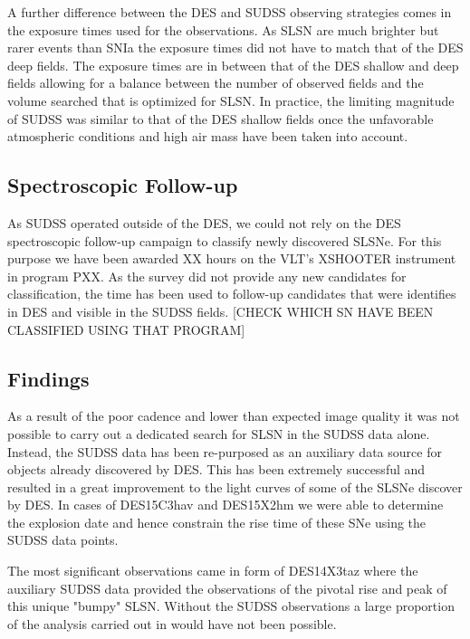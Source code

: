 A further difference between the DES and SUDSS observing strategies comes in the exposure times used for the observations. As SLSN are much brighter but rarer events than SNIa the exposure times did not have to match that of the DES deep fields. The exposure times are in between that of the DES shallow and deep fields allowing for a balance between the number of observed fields and the volume searched that is optimized for SLSN. In practice, the limiting magnitude of SUDSS was similar to that of the DES shallow fields once the unfavorable atmospheric conditions and high air mass have been taken into account.

\subsection{Spectroscopic Follow-up}
As SUDSS operated outside of the DES, we could not rely on the DES spectroscopic follow-up campaign to classify newly discovered SLSNe. For this purpose we have been awarded XX hours on the VLT's XSHOOTER instrument in program PXX. As the survey did not provide any new candidates for classification, the time has been used to follow-up candidates that were identifies in DES and visible in the SUDSS fields. [CHECK WHICH SN HAVE BEEN CLASSIFIED USING THAT PROGRAM] 

\subsection{Findings}
\label{sec:SUDSSIssues}
As a result of the poor cadence and lower than expected image quality it was not possible to carry out a dedicated search for SLSN in the SUDSS data alone. Instead, the SUDSS data has been re-purposed as an auxiliary data source for objects already discovered by DES. This has been extremely successful and resulted in a great improvement to the light curves of some of the SLSNe discover by DES. In cases of DES15C3hav and DES15X2hm we were able to determine the explosion date and hence constrain the rise time of these SNe using the SUDSS data points.

The most significant observations came in form of DES14X3taz where the auxiliary SUDSS data provided the observations of the pivotal rise and peak of this unique "bumpy" SLSN. Without the SUDSS observations a large proportion of the analysis carried out in \citep{Smith2016} would have not been possible.

